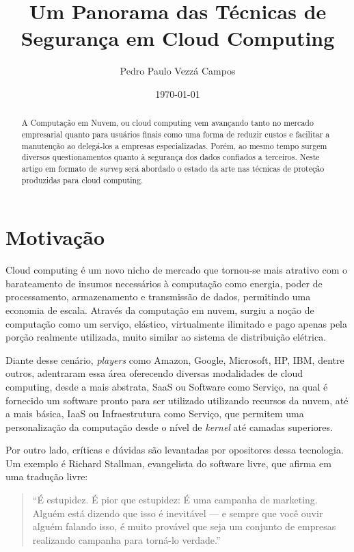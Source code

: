 \documentclass[brazil,12pt]{article}
\begin{document}
\title{Um Panorama das Técnicas de Segurança em Cloud Computing}
\author{Pedro Paulo Vezzá Campos}
\date{\today}
\maketitle

\begin{abstract}
A Computação em Nuvem, ou cloud computing vem avançando tanto no mercado
empresarial quanto para usuários finais como uma forma de
reduzir custos e facilitar a manutenção ao delegá-los a empresas especializadas.
Porém, ao mesmo tempo surgem diversos questionamentos quanto à segurança dos
dados confiados a terceiros. Neste artigo em formato de \emph{survey} será
abordado o estado da arte nas técnicas de proteção produzidas para cloud computing.
\end{abstract}

\section{Motivação}
Cloud computing é um novo nicho de mercado que tornou-se mais atrativo com o
barateamento de insumos necessários à computação como energia, poder de
processamento, armazenamento e transmissão de dados, permitindo uma economia de
escala. \cite{above-clouds} Através da computação em nuvem, surgiu a noção de
computação como um serviço, elástico, virtualmente ilimitado e pago apenas pela
porção realmente utilizada, muito similar ao sistema de distribuição elétrica.

Diante desse cenário, \emph{players} como Amazon, Google,
Microsoft, HP, IBM, dentre outros, adentraram essa área oferecendo diversas
modalidades de cloud computing, desde a mais abstrata, SaaS ou Software como
Serviço, na qual é fornecido um software pronto para ser utilizado utilizando
recursos da nuvem, até a mais básica, IaaS ou Infraestrutura como Serviço, que
permitem uma personalização da computação desde o nível de \emph{kernel} até
camadas superiores.

Por outro lado, críticas e dúvidas são levantadas por opositores dessa
tecnologia. Um exemplo é Richard Stallman, evangelista do software livre, que
afirma em uma tradução livre:

\begin{quote}
``É estupidez. É pior que estupidez: É uma campanha de marketing. Alguém está
dizendo que isso é inevitável — e sempre que você ouvir alguém falando isso, é
muito provável que seja um conjunto de empresas realizando campanha para
torná-lo verdade.'' \cite{stallman-cloud}
\end{quote}
\end{document}
